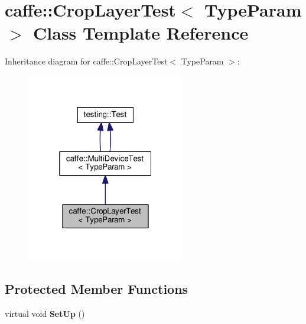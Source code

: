 \hypertarget{classcaffe_1_1_crop_layer_test}{}\section{caffe\+:\+:Crop\+Layer\+Test$<$ Type\+Param $>$ Class Template Reference}
\label{classcaffe_1_1_crop_layer_test}


Inheritance diagram for caffe\+:\+:Crop\+Layer\+Test$<$ Type\+Param $>$\+:
\nopagebreak
\begin{figure}[H]
\begin{center}
\leavevmode
\includegraphics[width=196pt]{classcaffe_1_1_crop_layer_test__inherit__graph}
\end{center}
\end{figure}
\subsection*{Protected Member Functions}
\begin{DoxyCompactItemize}
\item 
\mbox{\label{classcaffe_1_1_crop_layer_test_a911527f695503df12bf043ebf94c0ba2}} 
virtual void {\bfseries Set\+Up} ()
\end{DoxyCompactItemize}
